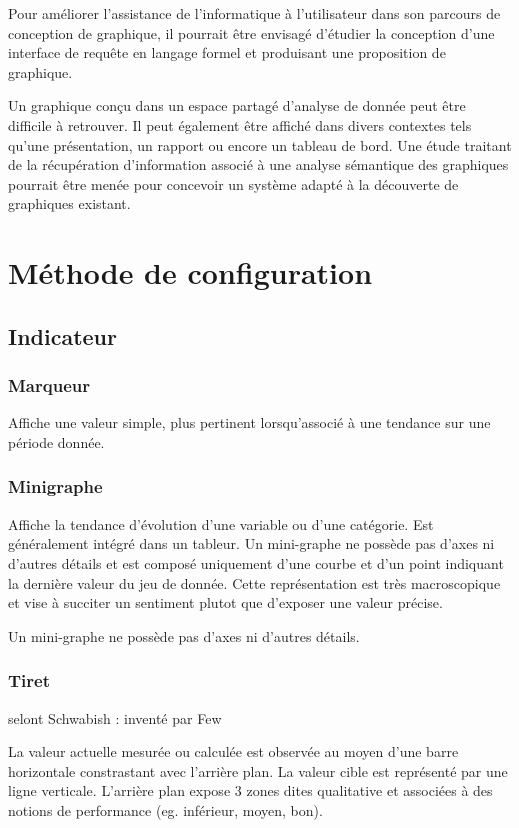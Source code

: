 \documentclass[a4paper,12pt]{article}
\begin{document}
\begin{multicols}{2}
Pour améliorer l'assistance de l'informatique à l'utilisateur dans son parcours de conception de graphique, il pourrait être envisagé d'étudier la conception d'une interface de requête en langage formel et produisant une proposition de graphique.

Un graphique conçu dans un espace partagé d'analyse de donnée peut être difficile à retrouver. Il peut également être affiché dans divers contextes tels qu'une présentation, un rapport ou encore un tableau de bord. Une étude traitant de la récupération d'information associé à une analyse sémantique des graphiques pourrait être menée pour concevoir un système adapté à la découverte de graphiques existant.
\section{Méthode de configuration}
\label{sec:org4df0168}
\subsection{Indicateur}
\label{sec:orga182bc7}
\subsubsection{Marqueur}
\label{sec:org46eaf09}
Affiche une valeur simple, plus pertinent lorsqu'associé à une tendance sur une période donnée. \autocite{mikeyiHowChooseRight2020}
\subsubsection{Minigraphe}
\label{sec:org994d18b}
Affiche la tendance d'évolution d'une variable ou d'une catégorie. Est généralement intégré dans un tableur. Un mini-graphe ne possède pas d'axes ni d'autres détails et est composé uniquement d'une courbe et d'un point indiquant la dernière valeur du jeu de donnée. \autocite{sosulskiGraphics2019} Cette représentation est très macroscopique et vise à succiter un sentiment plutot que d'exposer une valeur précise. \autocite{jonathanschwabishDistribution2021}

Un mini-graphe ne possède pas d'axes ni d'autres détails.
\subsubsection{Tiret}
\label{sec:org4a7ecb8}
selont Schwabish : inventé par Few

La valeur actuelle mesurée ou calculée est observée au moyen d'une barre horizontale constrastant avec l'arrière plan. \autocite{jonathanschwabishComparingCategories2021}
La valeur cible est représenté par une ligne verticale. \autocite{alansmithLexiqueVisuel}
L'arrière plan expose 3 zones dites qualitative et associées à des notions de performance (eg. inférieur, moyen, bon). \autocite{sosulskiGraphics2019}


\end{multicols}
\end{document}
